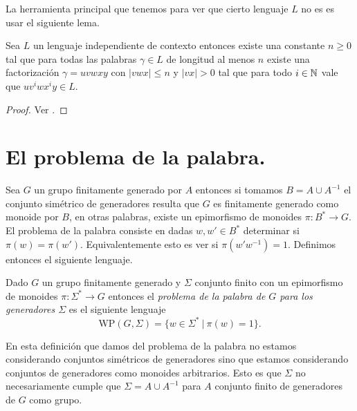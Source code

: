 \documentclass[tesis.tex]{subfiles}
\begin{document}
La herramienta principal que tenemos para ver que cierto lenguaje $L$ no es \ic es usar el siguiente lema.

\begin{lema}[Pumping] \label{pumping}
	Sea $L$ un lenguaje independiente de contexto entonces existe una constante $n \ge 0$ tal que para todas las palabras $\gamma \in L$ de longitud al menos $n$ existe una factorización $\gamma = uvwxy$ con $|vwx| \le n$ y $|vx| > 0$ tal que para todo $i \in \mathbb{N}$ vale que $uv^iwx^iy \in L$.
\end{lema}

\begin{proof}
	Ver \cite[p.281]{hopcraft-ullman}.
\end{proof}



\section{El problema de la palabra.}\label{secc_wp}


Sea $G$ un grupo finitamente generado por $A$ entonces si tomamos $B = A \cup A^{-1}$ el conjunto simétrico de generadores resulta que $G$ es finitamente generado como monoide por $B$, en otras palabras, existe un epimorfismo de monoides $\pi:B^* \to G$.
El problema de la palabra consiste en dadas $w,w' \in B^*$ determinar si $\pi(w) {=} \pi(w')$.
Equivalentemente esto es ver si $\pi(w'w^{-1}) = 1$.
Definimos entonces el siguiente lenguaje.

\begin{deff}
	Dado $G$ un grupo finitamente generado 
	y $\Sigma$ conjunto finito con un epimorfismo de monoides $\pi:\Sigma^* \to G$ entonces
	el \emph{problema de la palabra de $G$ para los generadores $\Sigma$} es el siguiente lenguaje	
	\[ 
	\text{WP} (G, \Sigma) = \{ w \in \Sigma^* \ | \ \pi(w)= 1 \}.
	\]
\end{deff}

\begin{obs}
	En esta definición que damos del problema de la palabra no estamos considerando conjuntos simétricos de generadores sino que estamos considerando conjuntos de generadores como monoides arbitrarios.
	Esto es que $\Sigma$ no necesariamente cumple que $\Sigma = A \cup A^{-1}$ para $A$ conjunto finito de generadores de $G$ como grupo.
\end{obs}
\end{document}
